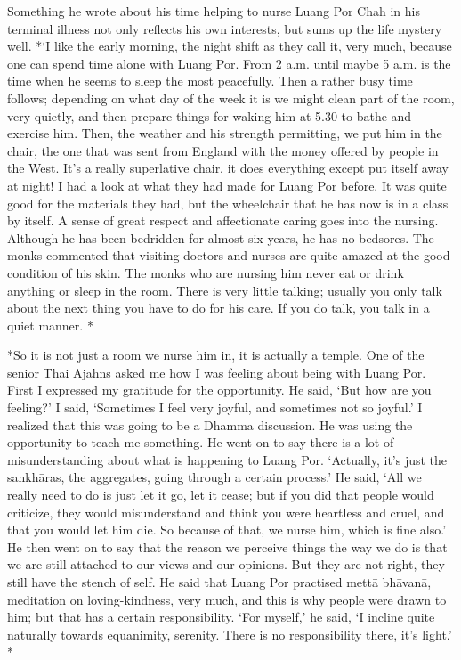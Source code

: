 Something he wrote about his time helping to nurse Luang Por Chah in his
terminal illness not only reflects his own interests, but sums up the
life mystery well. *`I like the early morning, the night shift as they
call it, very much, because one can spend time alone with Luang Por. 
From 2 a.m. until maybe 5 a.m. is the time when he seems to sleep the
most peacefully. Then a rather busy time follows; depending on what day
of the week it is we might clean part of the room, very quietly, and
then prepare things for waking him at 5.30 to bathe and exercise him. 
Then, the weather and his strength permitting, we put him in the chair, 
the one that was sent from England with the money offered by people in
the West. It's a really superlative chair, it does everything except put
itself away at night! I had a look at what they had made for Luang Por
before. It was quite good for the materials they had, but the wheelchair
that he has now is in a class by itself. A sense of great respect and
affectionate caring goes into the nursing. Although he has been
bedridden for almost six years, he has no bedsores. The monks commented
that visiting doctors and nurses are quite amazed at the good condition
of his skin. The monks who are nursing him never eat or drink anything
or sleep in the room. There is very little talking; usually you only
talk about the next thing you have to do for his care. If you do talk, 
you talk in a quiet manner. *

*So it is not just a room we nurse him in, it is actually a temple. One
of the senior Thai Ajahns asked me how I was feeling about being with
Luang Por. First I expressed my gratitude for the opportunity. He said, 
`But how are you feeling?' I said, `Sometimes I feel very joyful, and
sometimes not so joyful.' I realized that this was going to be a Dhamma
discussion. He was using the opportunity to teach me something. He went
on to say there is a lot of misunderstanding about what is happening to
Luang Por. `Actually, it's just the sankhāras, the aggregates, going
through a certain process.' He said, `All we really need to do is just
let it go, let it cease; but if you did that people would criticize, 
they would misunderstand and think you were heartless and cruel, and
that you would let him die. So because of that, we nurse him, which is
fine also.' He then went on to say that the reason we perceive things
the way we do is that we are still attached to our views and our
opinions. But they are not right, they still have the stench of self. He
said that Luang Por practised mettā bhāvanā, meditation on
loving-kindness, very much, and this is why people were drawn to him; 
but that has a certain responsibility. `For myself,' he said, `I incline
quite naturally towards equanimity, serenity. There is no responsibility
there, it's light.' *

